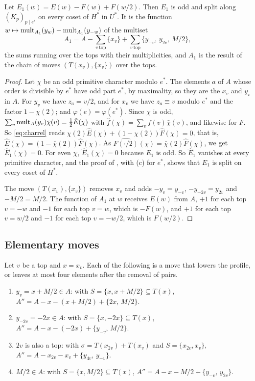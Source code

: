 \begin{lemma}\label{lem:E1}
Let $E_{1}(w)=E(w)-F(w)+F(w/2)$. Then $E_{1}$ is odd and split along
$(K_{p})_{p\mid e^{*}}$ on every coset of $H^{*}$ in $U^{*}$. It is the
function $w\mapsto\operatorname{mult}_{A_{1}}(y_{w})-\operatorname{mult}_{A_{1}}(y_{-w})$ of the multiset
\[
  A_{1}=A-\sum_{v\ \text{top}}\{x_{v}\}+\sum_{v\ \text{top}}\{y_{-v},\,y_{2v},
  \,M/2\},
\]
the sums running over the tops with their multiplicities, and $A_{1}$ is
the result of the chain of moves $(T(x_{v}),\{x_{v}\})$ over the tops.
\end{lemma}

\begin{proof}
Let $\chi$ be an odd primitive character modulo $e^{*}$. The elements $a$ of
$A$ whose order is divisible by $e^{*}$ have odd part $e^{*}$, by maximality,
so they are the $x_{v}$ and $y_{v}$ in $A$. For $y_{v}$ we have
$z_{a}=v/2$, and for $x_{v}$ we have $z_{a}\equiv v$ modulo $e^{*}$ and the
factor $1-\chi(2)$; and $\varphi(e)=\varphi(e^{*})$. Since $\chi$ is odd,
$\sum_{v}\operatorname{mult}_{A}(y_{v})\bar\chi(v)=\tfrac12\hat E(\chi)$ with $\hat
f(\chi)=\sum_{v}f(v)\bar\chi(v)$, and likewise for $F$. So \eqref{eq:charrel}
reads $\chi(2)\hat E(\chi)+(1-\chi(2))\hat F(\chi)=0$, that is, $\hat
E(\chi)=(1-\bar\chi(2))\hat F(\chi)$. As $\widehat{F(\cdot/2)}(\chi)=
\bar\chi(2)\hat F(\chi)$, we get $\hat E_{1}(\chi)=0$. For even $\chi$,
$\hat E_{1}(\chi)=0$ because $E_{1}$ is odd. So $\hat E_{1}$ vanishes at
every primitive character, and the proof of , with
(c) for $e^{*}$, shows that $E_{1}$ is split on every coset of
$H^{*}$.

The move $(T(x_{v}),\{x_{v}\})$ removes $x_{v}$ and adds
$-y_{v}=y_{-v}$, $-y_{-2v}=y_{2v}$ and $-M/2=M/2$. The function of
$A_{1}$ at $w$ receives $E(w)$ from $A$, $+1$ for each top $v=-w$ and $-1$ for
each top $v=w$, which is $-F(w)$, and $+1$ for each top $v=w/2$ and $-1$ for
each top $v=-w/2$, which is $F(w/2)$.
\end{proof}

\subsection{Elementary moves}

\begin{lemma}\label{lem:elementary}
Let $v$ be a top and $x=x_{v}$. Each of the following is a move that
lowers the profile, or leaves at most four elements after the removal of
pairs.
\begin{enumerate}[label=\textup{(\alph*)}]
\item $y_{v}=x+M/2\in A$: with $S=\{x,x+M/2\}\subseteq T(x)$,
$A''=A-x-(x+M/2)+\{2x,\,M/2\}$.
\item $y_{-2v}=-2x\in A$: with $S=\{x,-2x\}\subseteq T(x)$,
$A''=A-x-(-2x)+\{y_{-v},\,M/2\}$.
\item $2v$ is also a top: with $\sigma=T(x_{2v})+T(x_{v})$ and
$S=\{x_{2v},x_{v}\}$, $A''=A-x_{2v}-x_{v}+\{y_{4v},\,y_{-v}\}$.
\item $M/2\in A$: with $S=\{x,M/2\}\subseteq T(x)$,
$A''=A-x-M/2+\{y_{-v},\,y_{2v}\}$.
\end{enumerate}
\end{lemma}

